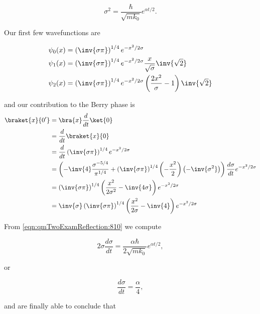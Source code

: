 \begin{equation}\label{eqn:qmTwoExamReflection:810}
\sigma^2 
= \frac{\hbar}{ \sqrt{m k_0} }
e^{\alpha t/2}.
\end{equation}

Our first few wavefunctions are

\begin{align}\label{eqn:qmTwoExamReflection:830}
\psi_0(x) 
&=
\left(\inv{\sigma\pi}\right)^{1/4} e^{- x^2/2 \sigma} \\
\psi_1(x) 
&=
\left(\inv{\sigma\pi}\right)^{1/4} e^{- x^2/2 \sigma} \frac{x}{\sqrt{\sigma}} \inv{\sqrt{2}} \\
\psi_2(x) 
&=
\left(\inv{\sigma\pi}\right)^{1/4} e^{- x^2/2 \sigma} \left( \frac{2 x^2}{\sigma} - 1 \right) \inv{\sqrt{2}}
\end{align}

and our contribution to the Berry phase is
\begin{align*}
\braket{x}{0'} 
&=
\bra{x}\frac{d}{dt} \ket{0} \\
&=
\frac{d}{dt} \braket{x}{0} \\
&=
\frac{d}{dt} \left(\inv{\sigma \pi}\right)^{1/4} e^{ - x^2/2 \sigma} \\
&=
\left(-\inv{4} \frac{\sigma^{-5/4}}{\pi^{1/4}} + 
\left(\inv{\sigma \pi}\right)^{1/4} \left(-\frac{x^2}{2}\right)\left(-\inv{\sigma^2}\right) \right) \frac{d\sigma}{dt} 
e^{ - x^2/2 \sigma} \\
&=
\left(\inv{\sigma \pi}\right)^{1/4} \left(\frac{x^2}{2\sigma^2} - \inv{4 \sigma} \right)
e^{ - x^2/2 \sigma} \\
&=
\inv{\sigma} \left(\inv{\sigma \pi}\right)^{1/4} \left(\frac{x^2}{2\sigma} - \inv{4} \right)
e^{ - x^2/2 \sigma} \\
\end{align*}

From \ref{eqn:qmTwoExamReflection:810} we compute

\begin{equation}\label{eqn:qmTwoExamReflection:870}
2 \sigma \frac{d\sigma}{dt} = \frac{\alpha \hbar}{2 \sqrt{m k_0}} e^{\alpha t/2},
\end{equation}

or

\begin{equation}\label{eqn:qmTwoExamReflection:890}
\frac{d\sigma}{dt} = \frac{\alpha}{4},
\end{equation}

and are finally able to conclude that

